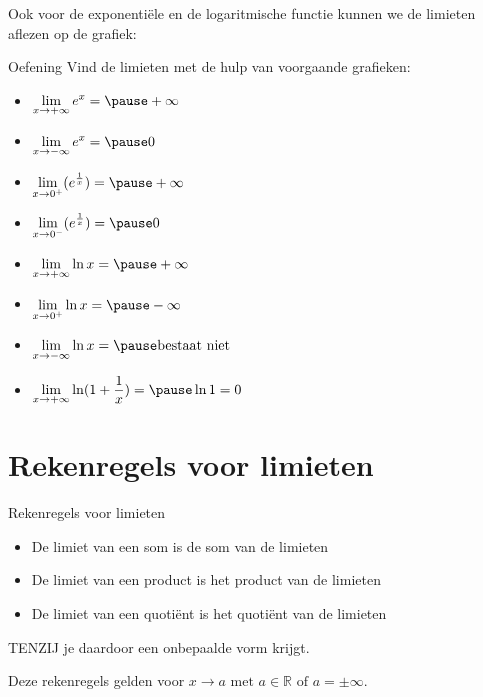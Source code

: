 \documentclass{beamer}
\newcommand{\ds}{\displaystyle}
\begin{document}
\begin{frame}
Ook voor de exponenti\"{e}le en de logaritmische functie kunnen we de
limieten aflezen op de grafiek:
\begin{center}
\end{center}
\end{frame}

\begin{frame}{Oefening}
Vind de limieten met de hulp van voorgaande grafieken:
\begin{itemize}

\item $\ds \lim_{x \rightarrow + \infty} e^x = \pause + \infty$
\item $\ds \lim_{x \rightarrow - \infty} e^x = \pause 0$

\item $\displaystyle{\lim_{x \to  0^+}} (e^{\frac 1x}) = \pause +\infty$
\item $\displaystyle{\lim_{x  \to  0^-}} (e^{\frac 1x}) = \pause 0$
\item $\ds \lim_{x \rightarrow + \infty} \ln x = \pause +\infty$
\item $\displaystyle{\lim_{x \to  0^+}} \ln x = \pause -\infty$
\item $\ds \lim_{x \rightarrow - \infty} \ln x = \pause \mbox{bestaat niet}$
\item $\ds \lim_{x \rightarrow + \infty} \ln(1+ \frac 1x) = \pause \ln 1 = 0$
\end{itemize}

\end{frame}



\section{Rekenregels voor limieten }
\begin{frame}{Rekenregels voor limieten}


\begin{itemize}
	\item De limiet
van een som is de som van de limieten
\item De limiet van een product is
het product van de limieten
\item De limiet van een quoti\"ent is het
quoti\"ent van de limieten
\end{itemize}
TENZIJ je daardoor een onbepaalde vorm
krijgt.

Deze rekenregels gelden voor $x \rightarrow a \text{ met } {a \in
\mathbb{R} \text{ of } a = \pm \infty}$.
\end{frame}
\end{document}
